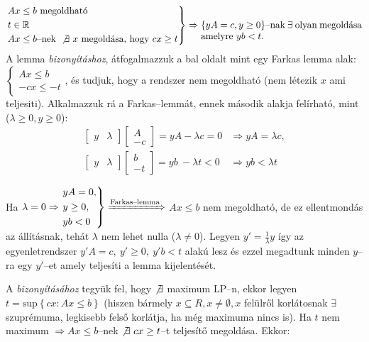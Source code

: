 \[
	\begin{rcases}
		Ax \leq b \mbox{ megoldható} \\
		t \in \mathbb{R}             \\
		Ax \leq b \mbox{--nek } \not \exists~x \mbox{ megoldása, hogy } cx \geq t
	\end{rcases} \Rightarrow
	\parbox[t]{6cm}{
		$\{yA=c, y \geq 0\}$--nak $\exists$ olyan megoldása amelyre  $yb < t$.}
\] A lemma \emph{bizonyításhoz}, átfogalmazzuk a bal oldalt mint egy Farkas
lemma alak:
$\begin{cases} Ax \leq b \\
		-cx \leq -t\end{cases}$, és tudjuk, hogy a rendszer nem megoldható (nem
létezik $x$ ami teljesiti). Alkalmazzuk rá a Farkas--lemmát, ennek második
alakja felírható, mint ($\lambda \geq 0, y
	\geq 0$):
\begin{align*}
	\begin{bmatrix} y & \lambda\end{bmatrix}
	\begin{bmatrix} A \\ -c \end{bmatrix} = yA - \lambda c = 0 & \Rightarrow
	yA = \lambda c,                                                          \\
	\begin{bmatrix} y & \lambda\end{bmatrix}
	\begin{bmatrix} b \\ -t \end{bmatrix} =yb~ - \lambda t < 0 & \Rightarrow
	yb < \lambda t
\end{align*}

Ha $\lambda=0 \Rightarrow \begin{rcases}
		yA = 0,   \\
		y \geq 0, \\
		yb <  0\end{rcases} \xRightarrow{\text{Farkas--lemma}}$ $Ax \leq b$ nem
megoldható, de ez ellentmondás az állításnak, tehát $\lambda$ nem lehet nulla
($\lambda \neq 0$). Legyen $y'=\frac{1}{\lambda}y$ így az egyenletrendszer
$y'A=c,~y'\geq0,~y'b<t$ alakú lesz és ezzel megadtunk minden $y$--ra egy
$y'$--et amely teljesíti a lemma kijelentését.

A  \emph{bizonyításához} tegyük fel, hogy $\not \exists$ maximum
LP--n, ekkor legyen $t=\mbox{sup}\left\{cx:Ax \leq b \right\}$ (hiszen bármely
$x \subseteq R, x \neq \emptyset, x$ felülről korlátosnak $\exists$ szuprémuma,
legkisebb felső korlátja, ha még maximuma nincs is). Ha $t$ nem maximum
$\Rightarrow Ax \leq b$--nek $\not \exists~cx \geq t$--t teljesítő megoldása.
Ekkor:

